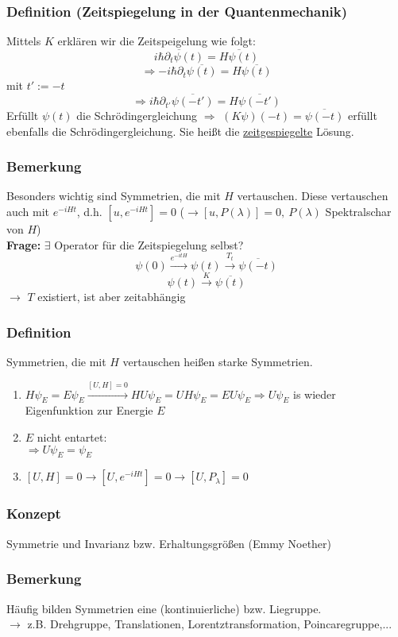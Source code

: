\documentclass[twoside,a4paper]{scrartcl}
\renewcommand{\1}{\mathds{1}}
\newcommand{\Ra}{\Rightarrow}
\newcommand{\ra}{\rightarrow}
\renewcommand{\l}{\lambda}
\begin{document}
\subsubsection*{Definition (Zeitspiegelung in der Quantenmechanik)}
Mittels $K$ erklären wir die Zeitspeigelung wie folgt:
$$\overline{i \hbar \partial_t \psi(t)}=\overline{H\psi(t)}$$
$$\Ra -i\hbar \partial_t \overline{\psi(t)}=H \overline{\psi(t)}$$
mit $t':=-t$
$$\Ra i \hbar \partial_{t'}\overline{\psi(-t')}=H\overline{\psi(-t')}$$
Erfüllt $\psi(t)$ die Schrödingergleichung $\Ra$ $(K\psi)(-t)=\overline{\psi(-t)}$ erfüllt ebenfalls die Schrödingergleichung. Sie heißt die \underline{zeitgespiegelte} Lösung.
\subsubsection*{Bemerkung}
Besonders wichtig sind Symmetrien, die mit $H$ vertauschen. Diese vertauschen auch mit $e^{-iHt}$, d.h. $[u, e^{-iHt}]=0$ ($\ra [u,P(\l)]=0, \ P(\l)$ Spektralschar von $H$)\\
\textbf{Frage:} $\exists$ Operator für die Zeitspiegelung selbst?\\
$$\psi(0) \stackrel{e^{-itH}}{\ra }\psi(t) \stackrel{T_t}{\ra} \overline{\psi(-t)} $$
$$\psi(t) \stackrel{K}{\ra} \overline{\psi(t)} $$
$\ra$ $T$ existiert, ist aber zeitabhängig

\subsubsection*{Definition}
Symmetrien, die mit $H$ vertauschen heißen starke Symmetrien.
\begin{enumerate}
\item $H\psi_E=E \psi_E \stackrel{[U,H]=0}{\ra} HU\psi_E=UH\psi_E=EU\psi_E \Ra U \psi_E$ is wieder Eigenfunktion zur Energie $E$
\item $E$ nicht entartet:\\
$\Ra U \psi_E=\psi_E$
\item $[U,H]=0 \ra [U,e^{-iHt}]=0 \ra [U, P_\lambda]=0$
\end{enumerate}
\subsubsection*{Konzept}
Symmetrie und Invarianz bzw. Erhaltungsgrößen (Emmy Noether)
\subsubsection*{Bemerkung}
Häufig bilden Symmetrien eine (kontinuierliche) bzw. Liegruppe.\\
$\ra$ z.B. Drehgruppe, Translationen, Lorentztransformation, Poincaregruppe,...
\end{document}
